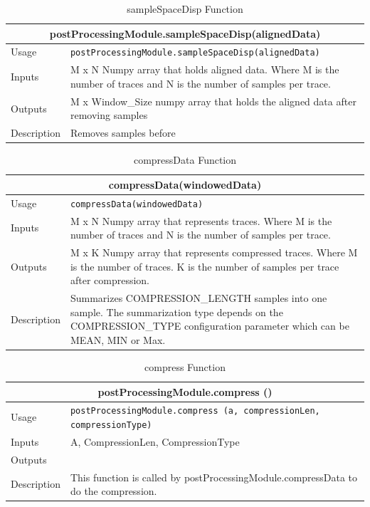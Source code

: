 \documentclass{llncs}
\numberwithin{algorithm}{chapter}
\begin{document}
\begin{table}
\caption{sampleSpaceDisp Function}
\begin{tabular}{ |p{2cm}||p{11cm}|  }
 \hline
 \multicolumn{2}{|c|}{\cellcolor{teal}\textbf{postProcessingModule.sampleSpaceDisp(alignedData)}} \\
 \hline
 Usage & \texttt{postProcessingModule.sampleSpaceDisp(alignedData)}\\ \hline
 Inputs & M x N Numpy array that holds aligned data. Where M is the number of traces and N is the number of samples per trace. \\ \hline
 Outputs & M x Window\_Size numpy array that holds the aligned data after removing samples  \\ \hline
 Description & Removes samples before  \\ \hline
\end{tabular}
\end{table}

\begin{table}
\caption{compressData Function}
\begin{tabular}{ |p{2cm}||p{11cm}|  }
 \hline
 \multicolumn{2}{|c|}{\cellcolor{teal}\textbf{compressData(windowedData)}} \\
 \hline
 Usage & \texttt{compressData(windowedData)}\\ \hline
 Inputs & M x N Numpy array that represents traces. Where M is the number of traces and N is the number of samples per trace. \\ \hline
 Outputs & M x K Numpy array that represents compressed traces. Where M is the number of traces. K is the number of samples per trace after compression.  \\ \hline
 Description & Summarizes COMPRESSION\_LENGTH samples into one sample. The summarization type depends on the COMPRESSION\_TYPE configuration parameter which can be MEAN, MIN or Max. \\ \hline
\end{tabular}
\end{table}

\begin{table}
\caption{compress Function}
\begin{tabular}{ |p{2cm}||p{11cm}|  }
 \hline
 \multicolumn{2}{|c|}{\cellcolor{teal}\textbf{postProcessingModule.compress ()}} \\
 \hline
 Usage & \texttt{postProcessingModule.compress (a, compressionLen, compressionType)}\\ \hline
 Inputs & A, CompressionLen, CompressionType \\ \hline
 Outputs &   \\ \hline
 Description & This function is called by postProcessingModule.compressData to do the compression. \\ \hline
\end{tabular}
\end{table}
\end{document}
